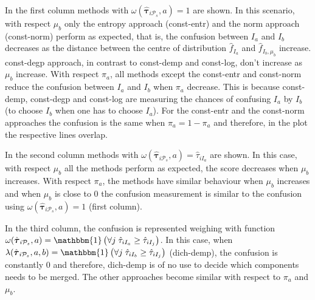 \documentclass[10pt, a4paper]{article}
\newcommand{\m}[1]{\boldsymbol{#1}}
\begin{document}
\begin{spacing}{1.9}
In the first column methods with $\omega(\hat{\m \tau}_{i \mathcal{P}_s}, a) = 1$ are shown. In this scenario, with respect $\mu_b$ only the entropy approach (const-entr) and the norm approach (const-norm) perform as expected, that is, the confusion between $I_a$ and $I_b$ decreases as the distance between the centre of distribution $\hat{f}_{I_a}$ and $\hat{f}_{I_b, \mu_b}$ increase. const-degp approach, in contrast to const-demp and const-log, don't increase as $\mu_b$ increase. With respect $\pi_a$, all methods except the const-entr and const-norm reduce the confusion between $I_a$ and $I_b$ when $\pi_a$ decrease. This is because const-demp, const-degp and const-log are measuring the chances of confusing $I_a$ by $I_b$ (to choose $I_b$ when one has to choose $I_a$). For the const-entr and the const-norm  approaches the confusion is the same when $\pi_a = 1- \pi_a$ and therefore, in the plot the respective lines overlap.



In the second column methods with $\omega(\hat{\m \tau}_{i \mathcal{P}_s}, a) = \hat{\tau}_{iI_a}$ are shown. In this case, with respect $\mu_b$ all the methods perform as expected, the score decreases when $\mu_b$ increases. With respect $\pi_a$, the methods have similar behaviour when $\mu_b$ increases and when $\mu_b$ is close to $0$ the confusion measurement is similar to the confusion using $\omega(\hat{\m \tau}_{i \mathcal{P}_s}, a) = 1$ (first column).

In the third column, the confusion is represented weighing with function $\omega(\hat{\m \tau}_{i \mathcal{P}_s}, a) = \mathbbm{1}\left( \forall j\; \hat{\tau}_{i I_{a}} \geq \hat{\tau}_{iI_j} \right)$. In this case, when  $\lambda(\hat{\m \tau}_{i \mathcal{P}_s}, a, b) = \mathbbm{1}\left( \forall j\; \hat{\tau}_{i I_{b}} \geq \hat{\tau}_{iI_j} \right)$ (dich-demp), the confusion is constantly $0$ and therefore, dich-demp is of no use to decide which components needs to be merged. The other approaches become similar with respect to $\pi_a$ and $\mu_b$.



\end{spacing}
\end{document}
